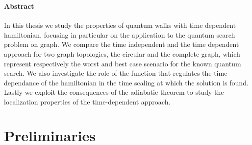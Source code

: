 \documentclass[11pt, twoside]{report}
\begin{document}
\newpage
\thispagestyle{empty}
\textbf{\Large{Abstract}} \\ \\
\noindent
In this thesis we study the properties of quantum walks with time dependent hamiltonian, focusing in particular on the application to the quantum search problem on graph. We compare the time independent and the time dependent approach for two graph topologies, the circular and the complete graph, which represent respectively the worst and best case scenario for the known quantum search. We also investigate the role of the function that regulates the time-dependance of the hamiltonian in the time scaling at which the solution is found. Lastly we exploit the consequences of the adiabatic theorem to study the localization properties of the time-dependent approach.

\newpage
\thispagestyle{empty}
\tableofcontents

\newpage
\thispagestyle{empty}
\chapter{Preliminaries}
\end{document}
